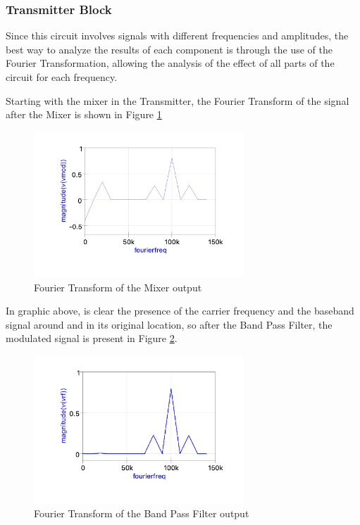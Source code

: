 \subsubsection{Transmitter Block}

Since this circuit involves signals with different frequencies and amplitudes, the best way to analyze the results of each component is through the use of the Fourier Transformation, allowing the analysis of the effect of all parts of the circuit for each frequency. 

Starting with the mixer in the Transmitter, the Fourier Transform of the signal after the Mixer is shown in Figure \ref{fig:Qucs_vmod}

\begin{figure}[H]
    \centering
    \includegraphics*[width=0.7\textwidth]{Images/Qucs_vmod.png}
    \caption{Fourier Transform of the Mixer output}
    \label{fig:Qucs_vmod}
\end{figure}

In graphic above, is clear the presence of the carrier frequency and the baseband signal around and in its original location, so after the Band Pass Filter, the modulated signal is present in Figure \ref{fig:Qucs_vrf_fft}.

\begin{figure}[H]
    \centering
    \includegraphics*[width=0.7\textwidth]{Images/Qucs_vrf_fft.png}
    \caption{Fourier Transform of the Band Pass Filter output}
    \label{fig:Qucs_vrf_fft}
\end{figure}


